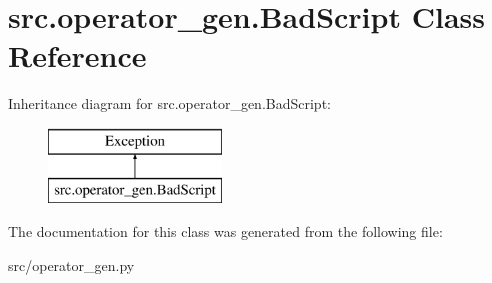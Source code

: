 \hypertarget{classsrc_1_1operator__gen_1_1BadScript}{}\section{src.\+operator\+\_\+gen.\+Bad\+Script Class Reference}
\label{classsrc_1_1operator__gen_1_1BadScript}
Inheritance diagram for src.\+operator\+\_\+gen.\+Bad\+Script\+:\begin{figure}[H]
\begin{center}
\leavevmode
\includegraphics[height=2.000000cm]{classsrc_1_1operator__gen_1_1BadScript}
\end{center}
\end{figure}


The documentation for this class was generated from the following file\+:\begin{DoxyCompactItemize}
\item 
src/operator\+\_\+gen.\+py\end{DoxyCompactItemize}
